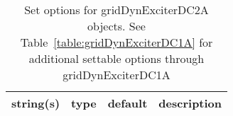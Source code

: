 \begin{table}[ht]
\centering
\begin{tabular}{p{5cm} c c p{7cm}}
\hline
string(s) & type & default & description \\
\hline
\hline
\end{tabular}
\caption{Set options for gridDynExciterDC2A objects. See Table~\ref{table:gridDynExciterDC1A} for additional settable options through gridDynExciterDC1A}
\label{table:gridDynExciterDC2A}
\end{table}
